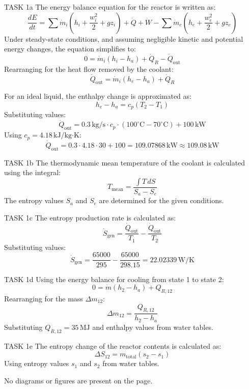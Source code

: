 TASK 1a  
The energy balance equation for the reactor is written as:  
\[
\frac{dE}{dt} = \sum \dot{m}_i \left( h_i + \frac{w_i^2}{2} + gz_i \right) + \dot{Q} + \dot{W} - \sum \dot{m}_e \left( h_e + \frac{w_e^2}{2} + gz_e \right)
\]  
Under steady-state conditions, and assuming negligible kinetic and potential energy changes, the equation simplifies to:  
\[
0 = \dot{m}_i (h_i - h_a) + \dot{Q}_R - \dot{Q}_{\text{out}}
\]  
Rearranging for the heat flow removed by the coolant:  
\[
\dot{Q}_{\text{out}} = \dot{m}_i (h_e - h_a) + \dot{Q}_R
\]  

For an ideal liquid, the enthalpy change is approximated as:  
\[
h_e - h_a = c_p (T_2 - T_1)
\]  
Substituting values:  
\[
\dot{Q}_{\text{out}} = 0.3 \, \text{kg/s} \cdot c_p \cdot (100^\circ\text{C} - 70^\circ\text{C}) + 100 \, \text{kW}
\]  
Using \( c_p = 4.18 \, \text{kJ/kg·K} \):  
\[
\dot{Q}_{\text{out}} = 0.3 \cdot 4.18 \cdot 30 + 100 = 109.07868 \, \text{kW} \approx 109.08 \, \text{kW}
\]  

TASK 1b  
The thermodynamic mean temperature of the coolant is calculated using the integral:  
\[
T_{\text{mean}} = \frac{\int T \, dS}{S_a - S_e}
\]  
The entropy values \( S_a \) and \( S_e \) are determined for the given conditions.

TASK 1c  
The entropy production rate is calculated as:  
\[
\dot{S}_{\text{gen}} = \frac{\dot{Q}_{\text{out}}}{T_1} - \frac{\dot{Q}_{\text{out}}}{T_2}
\]  
Substituting values:  
\[
\dot{S}_{\text{gen}} = \frac{65000}{295} - \frac{65000}{298.15} = 22.02339 \, \text{W/K}
\]  

TASK 1d  
Using the energy balance for cooling from state 1 to state 2:  
\[
0 = \dot{m} (h_2 - h_a) + Q_{R,12}
\]  
Rearranging for the mass \( \Delta m_{12} \):  
\[
\Delta m_{12} = \frac{Q_{R,12}}{h_2 - h_a}
\]  
Substituting \( Q_{R,12} = 35 \, \text{MJ} \) and enthalpy values from water tables.

TASK 1e  
The entropy change of the reactor contents is calculated as:  
\[
\Delta S_{12} = m_{\text{total}} (s_2 - s_1)
\]  
Using entropy values \( s_1 \) and \( s_2 \) from water tables.  

No diagrams or figures are present on the page.
